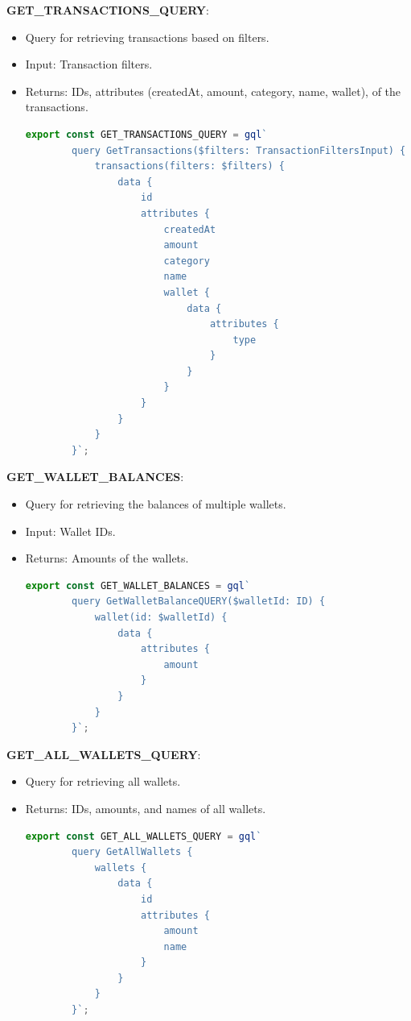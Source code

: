 \item \textbf{GET\_TRANSACTIONS\_QUERY}:
\begin{itemize}
    \item Query for retrieving transactions based on filters.
    \item Input: Transaction filters.
    \item Returns: IDs, attributes (createdAt, amount, category, name, wallet), of the transactions.
    \begin{lstlisting}[language=TypeScript]
    export const GET_TRANSACTIONS_QUERY = gql`
        query GetTransactions($filters: TransactionFiltersInput) {
            transactions(filters: $filters) {
                data {
                    id
                    attributes {
                        createdAt
                        amount
                        category
                        name
                        wallet {
                            data {
                                attributes {
                                    type
                                }
                            }
                        }
                    }
                }
            }
        }`;
    \end{lstlisting}
\end{itemize}

\item \textbf{GET\_WALLET\_BALANCES}:
\begin{itemize}
    \item Query for retrieving the balances of multiple wallets.
    \item Input: Wallet IDs.
    \item Returns: Amounts of the wallets.
    \begin{lstlisting}[language=TypeScript]
    export const GET_WALLET_BALANCES = gql`
        query GetWalletBalanceQUERY($walletId: ID) {
            wallet(id: $walletId) {
                data {
                    attributes {
                        amount
                    }
                }
            }
        }`;
    \end{lstlisting}
\end{itemize}

\item \textbf{GET\_ALL\_WALLETS\_QUERY}:
\begin{itemize}
    \item Query for retrieving all wallets.
    \item Returns: IDs, amounts, and names of all wallets.
    \begin{lstlisting}[language=TypeScript]
    export const GET_ALL_WALLETS_QUERY = gql`
        query GetAllWallets {
            wallets {
                data {
                    id
                    attributes {
                        amount
                        name
                    }
                }
            }
        }`;
    \end{lstlisting}
\end{itemize}

